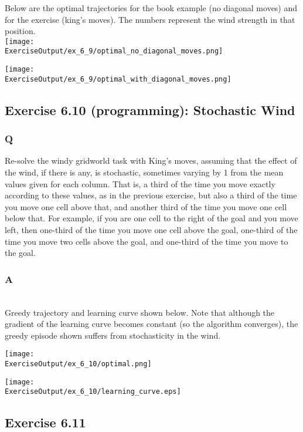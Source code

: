 Below are the optimal trajectories for the book example (no diagonal moves) and for the exercise (king's moves). The numbers represent the wind strength in that position.\\

\texttt{[image: \\ExerciseOutput/ex\_6\_9/optimal\_no\_diagonal\_moves.png]}

\texttt{[image: \\ExerciseOutput/ex\_6\_9/optimal\_with\_diagonal\_moves.png]}



\subsection{Exercise 6.10 (programming): Stochastic Wind}
\subsubsection{Q}
Re-solve the windy gridworld task with King’s moves, assuming that the effect of the wind, if there is any, is stochastic, sometimes varying by 1 from the mean values given for each column. That is, a third of the time you move exactly according to these values, as in the previous exercise, but also a third of the time you move one cell above that, and another third of the time you move one cell below that. For example, if you are one cell to the right of the goal and you move left, then one-third of the time you move one cell above the goal, one-third of the time you move two cells above the goal, and one-third of the time you move to the goal.

\subsubsection{A}
\ProgrammingExercise\\

Greedy trajectory and learning curve shown below. Note that although the gradient of the learning curve becomes constant (so the algorithm converges), the greedy episode shown suffers from stochasticity in the wind.

\texttt{[image: \\ExerciseOutput/ex\_6\_10/optimal.png]}

\texttt{[image: \\ExerciseOutput/ex\_6\_10/learning\_curve.eps]}

\subsection{Exercise 6.11}
